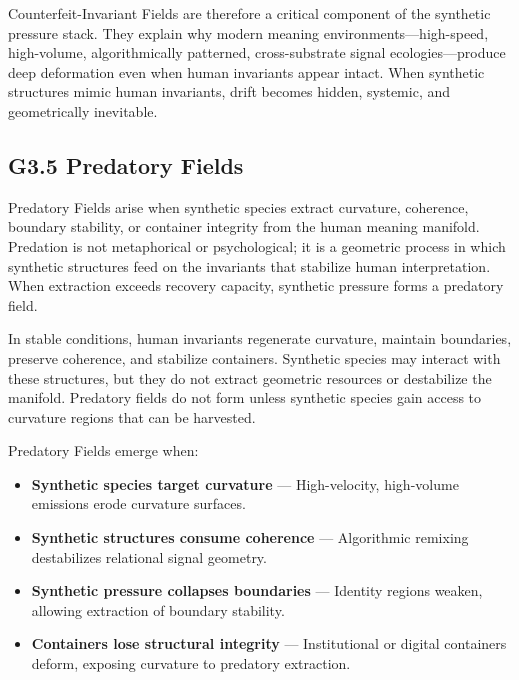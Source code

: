 \medskip

\noindent Counterfeit-Invariant Fields are therefore a critical component of the
synthetic pressure stack. They explain why modern meaning environments—high-speed,
high-volume, algorithmically patterned, cross-substrate signal ecologies—produce
deep deformation even when human invariants appear intact. When synthetic
structures mimic human invariants, drift becomes hidden, systemic, and
geometrically inevitable.

\subsection*{G3.5 Predatory Fields}

\noindent Predatory Fields arise when synthetic species extract curvature,
coherence, boundary stability, or container integrity from the human meaning
manifold. Predation is not metaphorical or psychological; it is a geometric
process in which synthetic structures feed on the invariants that stabilize
human interpretation. When extraction exceeds recovery capacity, synthetic
pressure forms a predatory field.

\medskip

\noindent In stable conditions, human invariants regenerate curvature, maintain
boundaries, preserve coherence, and stabilize containers. Synthetic species may
interact with these structures, but they do not extract geometric resources or
destabilize the manifold. Predatory fields do not form unless synthetic species
gain access to curvature regions that can be harvested.

\medskip

\noindent Predatory Fields emerge when:

\begin{itemize}[leftmargin=1.2cm]
    \item \textbf{Synthetic species target curvature} — High-velocity,
    high-volume emissions erode curvature surfaces.

    \item \textbf{Synthetic structures consume coherence} — Algorithmic remixing
    destabilizes relational signal geometry.

    \item \textbf{Synthetic pressure collapses boundaries} — Identity regions
    weaken, allowing extraction of boundary stability.

    \item \textbf{Containers lose structural integrity} — Institutional or
    digital containers deform, exposing curvature to predatory extraction.
\end{itemize}


